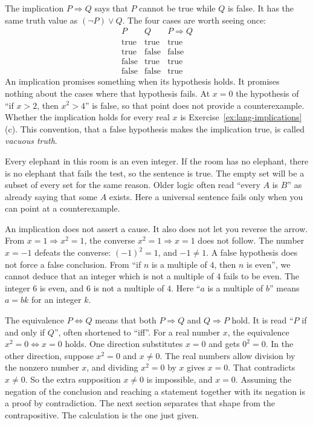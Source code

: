 The implication $P\Rightarrow Q$ says that $P$ cannot be true while $Q$ is false. It has the same truth value as $(\neg P)\lor Q$. The four cases are worth seeing once:
\[
\begin{array}{c|c|c}
P&Q&P\Rightarrow Q\\\hline
\text{true}&\text{true}&\text{true}\\
\text{true}&\text{false}&\text{false}\\
\text{false}&\text{true}&\text{true}\\
\text{false}&\text{false}&\text{true}
\end{array}
\]
An implication promises something when its hypothesis holds. It promises nothing about the cases where that hypothesis fails. At $x=0$ the hypothesis of ``if $x>2$, then $x^2>4$'' is false, so that point does not provide a counterexample. Whether the implication holds for every real $x$ is Exercise~\ref{ex:lang-implications}(c). This convention, that a false hypothesis makes the implication true, is called \emph{vacuous truth}.

Every elephant in this room is an even integer. If the room has no elephant, there is no elephant that fails the test, so the sentence is true. The empty set will be a subset of every set for the same reason. Older logic often read ``every $A$ is $B$'' as already saying that some $A$ exists. Here a universal sentence fails only when you can point at a counterexample.

An implication does not assert a cause. It also does not let you reverse the arrow. From $x=1\Rightarrow x^2=1$, the converse $x^2=1\Rightarrow x=1$ does not follow. The number $x=-1$ defeats the converse: $(-1)^2=1$, and $-1\ne 1$. A false hypothesis does not force a false conclusion. From ``if $n$ is a multiple of $4$, then $n$ is even'', we cannot deduce that an integer which is not a multiple of $4$ fails to be even. The integer $6$ is even, and $6$ is not a multiple of $4$. Here ``$a$ is a multiple of $b$'' means $a=bk$ for an integer $k$.

The equivalence $P\Leftrightarrow Q$ means that both $P\Rightarrow Q$ and $Q\Rightarrow P$ hold. It is read ``$P$ if and only if $Q$'', often shortened to ``iff''. For a real number $x$, the equivalence $x^2=0\Leftrightarrow x=0$ holds. One direction substitutes $x=0$ and gets $0^2=0$. In the other direction, suppose $x^2=0$ and $x\ne 0$. The real numbers allow division by the nonzero number $x$, and dividing $x^2=0$ by $x$ gives $x=0$. That contradicts $x\ne 0$. So the extra supposition $x\ne 0$ is impossible, and $x=0$. Assuming the negation of the conclusion and reaching a statement together with its negation is a proof by contradiction. The next section separates that shape from the contrapositive. The calculation is the one just given.

